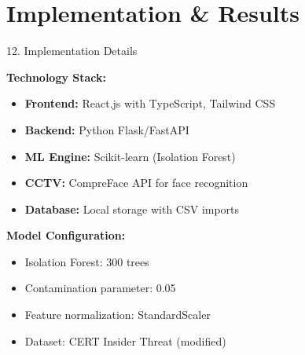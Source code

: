 \documentclass[aspectratio=169]{beamer}
\begin{document}

\section{Implementation \& Results}

\begin{frame}{12. Implementation Details}

\textbf{Technology Stack:}
\begin{itemize}
    \item \textbf{Frontend:} React.js with TypeScript, Tailwind CSS
    \item \textbf{Backend:} Python Flask/FastAPI
    \item \textbf{ML Engine:} Scikit-learn (Isolation Forest)
    \item \textbf{CCTV:} CompreFace API for face recognition
    \item \textbf{Database:} Local storage with CSV imports
\end{itemize}

\vspace{0.3cm}

\textbf{Model Configuration:}
\begin{itemize}
    \item Isolation Forest: 300 trees
    \item Contamination parameter: 0.05
    \item Feature normalization: StandardScaler
    \item Dataset: CERT Insider Threat (modified)
\end{itemize}

\end{frame}
\end{document}
